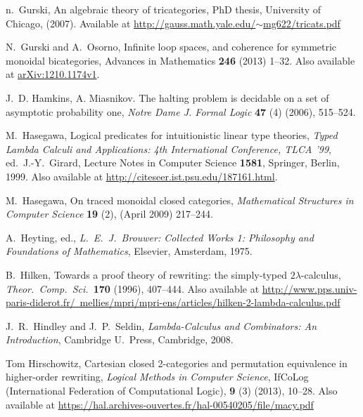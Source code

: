 \documentclass[12pt,twoside,openright]{report}
\begin{document}
\begin{thebibliography}{99}
 n.\ Gurski, An algebraic theory of tricategories, PhD thesis, University of Chicago, (2007).  Available at
\href{http://gauss.math.yale.edu/~mg622/tricats.pdf}
{http://gauss.math.yale.edu/$\sim$mg622/tricats.pdf}

 N.\ Gurski and A.\ Osorno, Infinite loop spaces, and coherence for symmetric monoidal bicategories, Advances in Mathematics \textbf{246} (2013) 1--32.  Also available at \href{http://arxiv.org/abs/1210.1174v1}{arXiv:1210.1174v1}.

 J.~D. Hamkins, A. Miasnikov. The halting problem is decidable on a set of asymptotic probability one, \textsl{Notre Dame J. Formal Logic} \textbf{47} (4) (2006), 515--524.

 M.\ Hasegawa, Logical predicates for intuitionistic linear type theories, {\sl Typed Lambda Calculi and Applications: 4th International Conference, TLCA '99}, ed.\ J.-Y.\ Girard, Lecture Notes in Computer Science {\bf 1581}, Springer, Berlin, 1999. Also available at \href{http://citeseer.ist.psu.edu/187161.html}
{http://citeseer.ist.psu.edu/187161.html}.

 M.\ Hasegawa, On traced monoidal closed categories, \textsl{Mathematical Structures in Computer Science} \textbf{19} (2), (April 2009) 217--244.

 A.\ Heyting, ed., {\sl L.\ E.\ J.\ Brouwer: Collected Works 1: Philosophy and Foundations of Mathematics}, Elsevier, Amsterdam,
1975. 

 B.\ Hilken, Towards a proof theory of rewriting: the simply-typed $2\lambda$-calculus, {\sl Theor.\ Comp.\ Sci.\ }{\bf 170} 
(1996), 407--444.  Also available at \href{http://www.pps.univ-paris-diderot.fr/~mellies/mpri/mpri-ens/articles/hilken-2-lambda-calculus.pdf}{http://www.pps.univ-paris-diderot.fr/~mellies/mpri/mpri-ens/articles/hilken-2-lambda-calculus.pdf}

 J.\ R.\ Hindley and J.\ P.\ Seldin, {\sl Lambda-Calculus and Combinators: An Introduction}, Cambridge U.\ Press, Cambridge, 2008.

 Tom Hirschowitz, Cartesian closed 2-categories and permutation equivalence in higher-order
rewriting, {\sl Logical Methods in Computer Science}, IfCoLog (International Federation of Computational
Logic), {\bf 9} (3) (2013), 10--28.  Also available at \href{https://hal.archives-ouvertes.fr/hal-00540205/file/macy.pdf}{https://hal.archives-ouvertes.fr/hal-00540205/file/macy.pdf}


\end{thebibliography}
\end{document}
